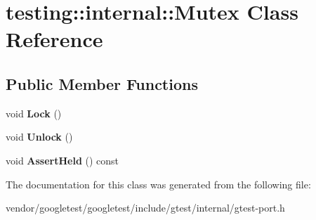 \hypertarget{classtesting_1_1internal_1_1Mutex}{}\section{testing\+:\+:internal\+:\+:Mutex Class Reference}
\label{classtesting_1_1internal_1_1Mutex}
\subsection*{Public Member Functions}
\begin{DoxyCompactItemize}
\item 
void {\bfseries Lock} ()\hypertarget{classtesting_1_1internal_1_1Mutex_ae7e2191886c00182176b23c4f4d049f8}{}\label{classtesting_1_1internal_1_1Mutex_ae7e2191886c00182176b23c4f4d049f8}

\item 
void {\bfseries Unlock} ()\hypertarget{classtesting_1_1internal_1_1Mutex_a315188055de1be98884519ad84eff2e6}{}\label{classtesting_1_1internal_1_1Mutex_a315188055de1be98884519ad84eff2e6}

\item 
void {\bfseries Assert\+Held} () const \hypertarget{classtesting_1_1internal_1_1Mutex_a3a0530bca3110025d85b2aa51f3ca0d7}{}\label{classtesting_1_1internal_1_1Mutex_a3a0530bca3110025d85b2aa51f3ca0d7}

\end{DoxyCompactItemize}


The documentation for this class was generated from the following file\+:\begin{DoxyCompactItemize}
\item 
vendor/googletest/googletest/include/gtest/internal/gtest-\/port.\+h\end{DoxyCompactItemize}
